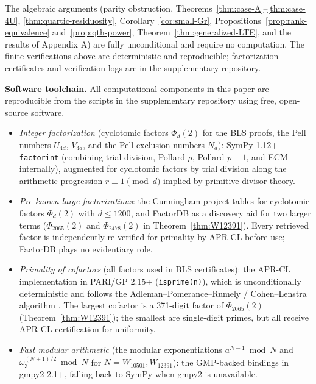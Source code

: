 \documentclass[12pt]{article}
\theoremstyle{plain}
\theoremstyle{definition}
\theoremstyle{remark}
\begin{document}
The algebraic arguments (parity obstruction, Theorems~\ref{thm:case-A}--\ref{thm:case-4U},
\ref{thm:quartic-residuosity}, Corollary~\ref{cor:small-Gr}, Propositions~\ref{prop:rank-equivalence} and~\ref{prop:qth-power}, Theorem~\ref{thm:generalized-LTE}, and
the results of Appendix A) are fully unconditional and require no
computation. The finite verifications above are deterministic and
reproducible; factorization certificates and verification logs are
in the supplementary repository.

\textbf{Software toolchain.} All computational components in this paper
are reproducible from the scripts in the supplementary repository
using free, open-source software.

\begin{itemize}
\item \emph{Integer factorization} (cyclotomic factors \(\Phi_d(2)\) for the
  BLS proofs, the Pell numbers \(U_{4d}\), \(V_{4d}\), and the Pell
  exclusion numbers \(N_d\)): SymPy 1.12+ \texttt{factorint} (combining trial
  division, Pollard \(\rho\), Pollard \(p\!-\!1\), and ECM internally),
  augmented for cyclotomic factors by trial division along the
  arithmetic progression \(r \equiv 1 \pmod{d}\) implied by primitive
  divisor theory.
\item \emph{Pre-known large factorizations}: the Cunningham project tables
  \cite{ref4} for cyclotomic
  factors \(\Phi_d(2)\) with \(d \leq 1200\), and FactorDB as a
  discovery aid for two larger terms
  (\(\Phi_{2065}(2)\) and \(\Phi_{2478}(2)\) in
  Theorem~\ref{thm:W12391}). Every retrieved factor is independently
  re-verified for primality by APR-CL before use; FactorDB plays no
  evidentiary role.
\item \emph{Primality of cofactors} (all factors used in BLS certificates):
  the APR-CL implementation in PARI/GP 2.15+
  (\texttt{isprime(n)}), which is unconditionally deterministic and
  follows the Adleman--Pomerance--Rumely / Cohen--Lenstra algorithm
  \cite{ref6}. The largest cofactor is a 371-digit factor of
  \(\Phi_{2065}(2)\) (Theorem~\ref{thm:W12391}); the smallest are single-digit
  primes, but all receive APR-CL certification for uniformity.
\item \emph{Fast modular arithmetic} (the modular exponentiations
  \(a^{N-1} \bmod N\) and \(\omega_3^{(N+1)/2} \bmod N\) for
  \(N = W_{10501}, W_{12391}\)): the GMP-backed bindings in
  gmpy2 2.1+, falling back to SymPy when gmpy2 is unavailable.
\end{itemize}
\end{document}
